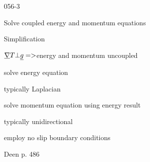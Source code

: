 \begin{mitframe}{056-3}
\begin{listone}
	\item Solve coupled energy and momentum equations
    \item Simplification
    		\begin{listtwo}
            	\item $\gradop\Temp\bot\uline{\grav}=>$energy and momentum uncoupled
                	\begin{listfour}
                    		\item solve energy equation
                            		\begin{listfive}
                                    		\item typically Laplacian
                                    \end{listfive}
                              \item solve momentum equation using energy result
                              		\begin{listfive}
                                    	\item typically unidirectional 
                                        \item employ no slip boundary conditions
                                        
                                    \end{listfive}
                    \end{listfour}
            \end{listtwo}
Deen p. 486
\end{listone}        
\end{mitframe}